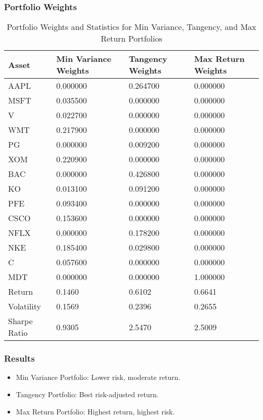 \documentclass{beamer}
\begin{document}
\begin{frame}
\frametitle{Portfolio Weights}
\begin{table}[h]
    \centering
    \begin{adjustbox}{width=0.8\linewidth,center}  %
      \begin{tabular}{llll}
\toprule
Asset & Min Variance Weights & Tangency Weights & Max Return Weights \\
\midrule
AAPL & 0.000000 & 0.264700 & 0.000000 \\
MSFT & 0.035500 & 0.000000 & 0.000000 \\
V & 0.022700 & 0.000000 & 0.000000 \\
WMT & 0.217900 & 0.000000 & 0.000000 \\
PG & 0.000000 & 0.009200 & 0.000000 \\
XOM & 0.220900 & 0.000000 & 0.000000 \\
BAC & 0.000000 & 0.426800 & 0.000000 \\
KO & 0.013100 & 0.091200 & 0.000000 \\
PFE & 0.093400 & 0.000000 & 0.000000 \\
CSCO & 0.153600 & 0.000000 & 0.000000 \\
NFLX & 0.000000 & 0.178200 & 0.000000 \\
NKE & 0.185400 & 0.029800 & 0.000000 \\
C & 0.057600 & 0.000000 & 0.000000 \\
MDT & 0.000000 & 0.000000 & 1.000000 \\
\midrule
Return & 0.1460 & 0.6102 & 0.6641 \\
Volatility & 0.1569 & 0.2396 & 0.2655 \\
Sharpe Ratio & 0.9305 & 2.5470 & 2.5009 \\
\bottomrule
\end{tabular}
    \end{adjustbox}
    \caption{Portfolio Weights and Statistics for Min Variance, Tangency, and Max Return Portfolios}
\end{table}
\end{frame}

\begin{frame}
\frametitle{Results}
\begin{itemize}
    \item Min Variance Portfolio: Lower risk, moderate return.
    \item Tangency Portfolio: Best risk-adjusted return.
    \item Max Return Portfolio: Highest return, highest risk.
\end{itemize}
\end{frame}
\end{document}
